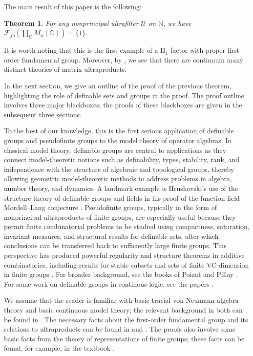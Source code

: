 \documentclass[12pt]{amsart}
\numberwithin{equation}{section}
\newtheorem*{thm*}{Theorem}
\theoremstyle{definition}
\newcommand{\N}{\mathbb{N}}
\def\bb{\mathbb}
\def\cal{\mathcal}
\newcommand\cU{{\cal U}}
\begin{document}
The main result of this paper is the following:

\begin{thm*}
For any nonprincipal ultrafilter $\cU$ on $\N$, we have $\mathcal{F}_{fo}(\prod_\cU M_n(\bb C))=\{1\}$. 
\end{thm*}

It is worth noting that this is the first example of a II$_1$ factor with proper first-order fundamental group.  Moreover, by \cite[Proposition 4.16]{goldbring2017theories}, we see that there are continuum many distinct theories of matrix ultraproducts.

In the next section, we give an outline of the proof of the previous theorem, highlighting the role of definable sets and groups in the proof.  The proof outline involves three major blackboxes; the proofs of these blackboxes are given in the subsequent three sections. 

To the best of our knowledge, this is the first serious application of definable groups and pseudofinite groups to the model theory of operator algebras.  In classical model theory, definable groups are central to applications as they connect model-theoretic notions such as definability, types, stability, rank, and independence with the structure of algebraic and topological groups, thereby allowing geometric model-theoretic methods to address problems in algebra, number theory, and dynamics.  A landmark example is Hrushovski’s use of the structure theory of definable groups and fields in his proof of the function-field Mordell–Lang conjecture \cite{hrushovski1996mordell}. Pseudofinite groups, typically in the form of nonprincipal ultraproducts of finite groups, are especially useful because they permit finite combinatorial problems to be studied using compactness, saturation, invariant measures, and structural results for definable sets, after which conclusions can be transferred back to sufficiently large finite groups. This perspective has produced powerful regularity and structure theorems in additive combinatorics, including results for stable subsets and sets of finite VC-dimension in finite groups \cite{conant2020group, conant2021structure}. For broader background, see the books of Poizat \cite{poizat2001stable} and Pillay \cite{pillay1996geometric}.  For some work on definable groups in continous logic, see the papers \cite{yaacov2010stability,carmona2022definably,ivanov2021metric}.

We assume that the reader is familiar with basic tracial von Neumann algebra theory and basic continuous model theory; the relevant background in both can be found in \cite{goldbring2023model}.  The necessary facts about the first-order fundamental group and its relations to ultraproducts can be found in \cite{goldbring2017theories} and \cite{goldbring2023first}.  The proofs also involve some basic facts from the theory of representations of finite groups; these facts can be found, for example, in the textbook \cite{james2001representations}.  
\end{document}
